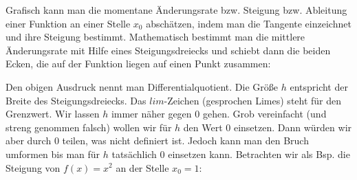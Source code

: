 Grafisch kann man die momentane Änderungsrate bzw. Steigung bzw. Ableitung einer Funktion an einer Stelle \(x_0\) abschätzen, indem man die Tangente einzeichnet und ihre Steigung bestimmt. Mathematisch bestimmt man die mittlere Änderungsrate mit Hilfe eines Steigungsdreiecks und schiebt dann die beiden Ecken, die auf der Funktion liegen auf einen Punkt zusammen:
Den obigen Ausdruck nennt man Differentialquotient. Die Größe \(h\) entspricht der Breite des Steigungsdreiecks. Das \(lim\)-Zeichen (gesprochen Limes) steht für den Grenzwert. Wir lassen \(h\) immer näher gegen \(0\) gehen. Grob vereinfacht (und streng genommen falsch) wollen wir für \(h\) den Wert \(0\) einsetzen. Dann würden wir aber durch \(0\) teilen, was nicht definiert ist. Jedoch kann man den Bruch umformen bis man für \(h\) tatsächlich \(0\) einsetzen kann. Betrachten wir als Bsp. die Steigung von \(f(x)=x^2\) an der Stelle \(x_0=1\):

\begin{minipage}{\textwidth}
\end{minipage}

